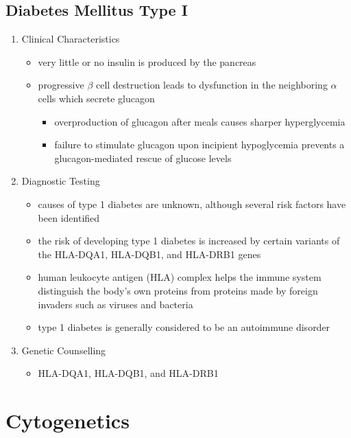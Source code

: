 \documentclass[12pt]{scrartcl}
\begin{document}
\subsection{Diabetes Mellitus Type I}
\label{sec:org5fa72c0}
\begin{enumerate}
\item Clinical Characteristics
\label{sec:org2192604}
\begin{itemize}
\item very little or no insulin is produced by the pancreas
\item progressive \(\beta\) cell destruction leads to dysfunction in the
neighboring \(\alpha\) cells which secrete glucagon
\begin{itemize}
\item overproduction of glucagon after meals causes sharper hyperglycemia
\item failure to stimulate glucagon upon incipient hypoglycemia prevents
a glucagon-mediated rescue of glucose levels
\end{itemize}
\end{itemize}
\item Diagnostic Testing
\label{sec:orga2f974b}
\begin{itemize}
\item causes of type 1 diabetes are unknown, although several risk factors
have been identified
\item the risk of developing type 1 diabetes is increased by certain
variants of the HLA-DQA1, HLA-DQB1, and HLA-DRB1 genes
\item human leukocyte antigen (HLA) complex helps the immune system
distinguish the body's own proteins from proteins made by foreign
invaders such as viruses and bacteria
\item type 1 diabetes is generally considered to be an autoimmune
disorder
\end{itemize}

\item Genetic Counselling
\label{sec:org3f65e19}
\begin{itemize}
\item HLA-DQA1, HLA-DQB1, and HLA-DRB1
\end{itemize}
\end{enumerate}

\section{Cytogenetics}
\label{sec:org955ee26}
\end{document}
